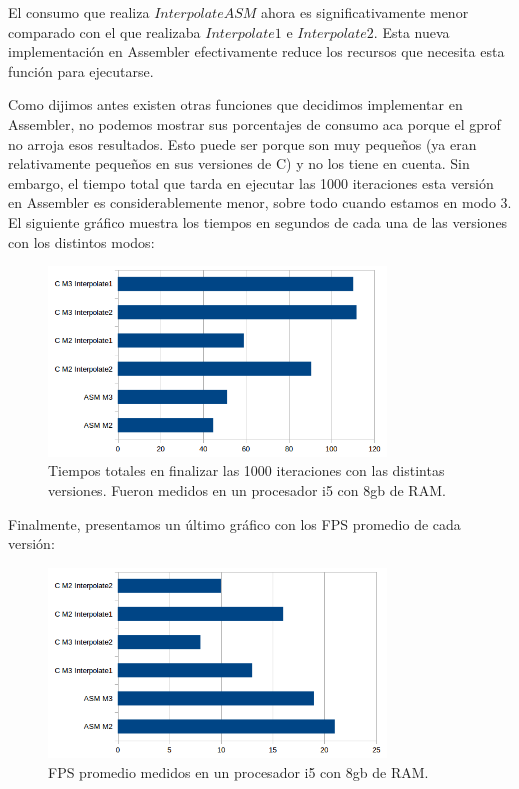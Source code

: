 \documentclass[a4paper]{article}
\begin{document}
El consumo que realiza $InterpolateASM$ ahora es significativamente menor comparado con el que realizaba $Interpolate1$ e $Interpolate2$. Esta nueva implementación en Assembler efectivamente reduce los recursos que necesita esta función para ejecutarse.

Como dijimos antes existen otras funciones que decidimos implementar en Assembler, no podemos mostrar sus porcentajes de consumo aca porque el gprof no arroja esos resultados. Esto puede ser porque son muy pequeños (ya eran relativamente pequeños en sus versiones de C) y no los tiene en cuenta. Sin embargo, el tiempo total que tarda en ejecutar las 1000 iteraciones esta versión en Assembler es considerablemente menor, sobre todo cuando estamos en modo 3. El siguiente gráfico muestra los tiempos en segundos de cada una de las versiones con los distintos modos:

\begin{figure}[H]
    \centering
    \includegraphics[width=0.8\textwidth]{Imagenes/tiemposTotales.png}
    \caption{Tiempos totales en finalizar las 1000 iteraciones con las distintas versiones. Fueron medidos en un procesador i5 con 8gb de RAM.}
    \label{fig:mesh1}
\end{figure}

Finalmente, presentamos un último gráfico con los FPS promedio de cada versión:
\begin{figure}[H]
    \centering
    \includegraphics[width=0.8\textwidth]{Imagenes/fps.png}
    \caption{FPS promedio medidos en un procesador i5 con 8gb de RAM.}
    \label{fig:mesh1}
\end{figure}
\end{document}
